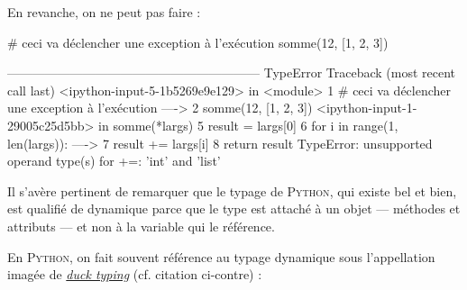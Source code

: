 En revanche, on ne peut pas faire :

\begin{nbjupyterin}[before skip=4pt, after skip=1pt]{5}
# ceci va déclencher une exception à l'exécution
somme(12, [1, 2, 3])
\end{nbjupyterin}
\begin{nbjupyterout}[before skip=1pt, after skip=4pt]{5}
------------------------------------------------------------
TypeError                  Traceback (most recent call last)
<ipython-input-5-1b5269e9e129> in <module>
      1 # ceci va déclencher une exception à l'exécution
----> 2 somme(12, [1, 2, 3])
<ipython-input-1-29005c25d5bb> in somme(*largs)
      5     result = largs[0]
      6     for i in range(1, len(largs)):
----> 7         result += largs[i]
      8     return result
TypeError: unsupported operand type(s) for +=: 'int' and 'list'
\end{nbjupyterout}

Il s'avère pertinent de remarquer que le typage de \textsc{Python}, qui existe bel et bien, est qualifié de dynamique parce que le type est attaché à un objet --- méthodes et attributs --- et non à la variable qui le référence.

%
En \textsc{Python}, on fait souvent référence au typage dynamique sous l'appellation imagée de 
\href{https://fr.wikipedia.org/wiki/Duck\_typing}{\textit{duck typing}} (cf. citation ci-contre) :

